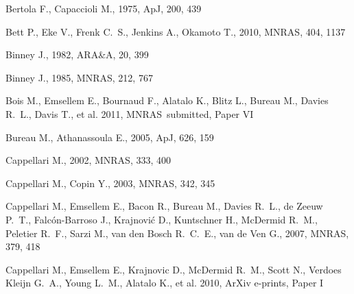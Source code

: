 \documentclass[usenatbib,usegraphicx]{mn2e}
\def\araa{ARA\&A}       %
\def\apj{ApJ}           %
\def\mnras{MNRAS}       %
\begin{document}
\begin{thebibliography}{}
{Bertola} F.,  {Capaccioli} M.,  1975, \apj, 200, 439

{Bett} P.,  {Eke} V.,  {Frenk} C.~S.,  {Jenkins} A.,    {Okamoto} T.,  2010,
  \mnras, 404, 1137

{Binney} J.,  1982, \araa, 20, 399

{Binney} J.,  1985, \mnras, 212, 767

{Bois} M.,  {Emsellem} E.,  {Bournaud} F.,  {Alatalo} K.,  {Blitz} L.,
  {Bureau} M.,  {Davies} R.~L.,  {Davis} T.,    {et al.} 2011,
  \mnras~submitted, Paper VI

{Bureau} M.,  {Athanassoula} E.,  2005, \apj, 626, 159

{Cappellari} M.,  2002, \mnras, 333, 400

{Cappellari} M.,  {Copin} Y.,  2003, \mnras, 342, 345

{Cappellari} M.,  {Emsellem} E.,  {Bacon} R.,  {Bureau} M.,  {Davies} R.~L.,
  {de Zeeuw} P.~T.,  {Falc{\'o}n-Barroso} J.,  {Krajnovi{\'c}} D.,
  {Kuntschner} H.,  {McDermid} R.~M.,  {Peletier} R.~F.,  {Sarzi} M.,  {van den
  Bosch} R.~C.~E.,    {van de Ven} G.,  2007, \mnras, 379, 418

{Cappellari} M.,  {Emsellem} E.,  {Krajnovic} D.,  {McDermid} R.~M.,  {Scott}
  N.,  {Verdoes Kleijn} G.~A.,  {Young} L.~M.,  {Alatalo} K.,    {et al.} 2010,
  ArXiv e-prints, Paper I


\end{thebibliography}
\end{document}
